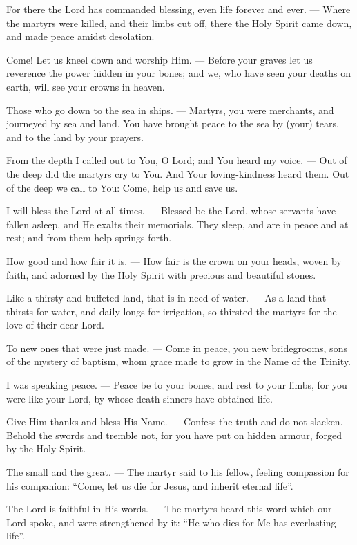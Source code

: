 \documentclass[12pt,twoside,a5paper]{article}
\begin{document}
\begin{halfparskip}
  For there the Lord has commanded blessing, even life forever and ever. --- Where the martyrs were killed, and their limbs cut off, there the Holy Spirit came down, and made peace amidst desolation.

  Come! Let us kneel down and worship Him. --- Before your graves let us reverence the power hidden in your bones; and we, who have seen your deaths on earth, will see your crowns in heaven.

  Those who go down to the sea in ships. --- Martyrs, you were merchants, and journeyed by sea and land. You have brought peace to the sea by (your) tears, and to the land by your prayers.

  From the depth I called out to You, O Lord; and You heard my voice. --- Out of the deep did the martyrs cry to You. And Your loving-kindness heard them. Out of the deep we call to You: Come, help us and save us.

  I will bless the Lord at all times. --- Blessed be the Lord, whose servants have fallen asleep, and He exalts their memorials. They sleep, and are in peace and at rest; and from them help springs forth.

  How good and how fair it is. --- How fair is the crown on your heads, woven by faith, and adorned by the Holy Spirit with precious and beautiful stones.

  Like a thirsty and buffeted land, that is in need of water. --- As a land that thirsts for water, and daily longs for irrigation, so thirsted the martyrs for the love of their dear Lord.

  To new ones that were just made. --- Come in peace, you new bridegrooms, sons of the mystery of baptism, whom grace made to grow in the Name of the Trinity.

  I was speaking peace. --- Peace be to your bones, and rest to your limbs, for you were like your Lord, by whose death sinners have obtained life.

  Give Him thanks and bless His Name. --- Confess the truth and do not slacken. Behold the swords and tremble not, for you have put on hidden armour, forged by the Holy Spirit.

  The small and the great. --- The martyr said to his fellow, feeling compassion for his companion: ``Come, let us die for Jesus, and inherit eternal life''.

  The Lord is faithful in His words. --- The martyrs heard this word which our Lord spoke, and were strengthened by it: ``He who dies for Me has everlasting life''.


\end{halfparskip}
\end{document}

